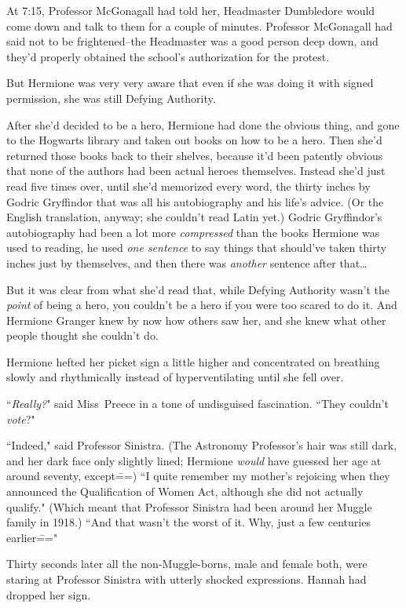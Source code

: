 At 7:15\pm, Professor McGonagall had told her, Headmaster Dumbledore would come down and talk to them for a couple of minutes. Professor McGonagall had said not to be frightened\---the Headmaster was a good person deep down, and they'd properly obtained the school's authorization for the protest.

But Hermione was very very aware that even if she was doing it with signed permission, she was still Defying Authority.

After she'd decided to be a hero, Hermione had done the obvious thing, and gone to the Hogwarts library and taken out books on how to be a hero. Then she'd returned those books back to their shelves, because it'd been patently obvious that none of the authors had been actual heroes themselves. Instead she'd just read five times over, until she'd memorized every word, the thirty inches by Godric Gryffindor that was all his autobiography and his life's advice. (Or the English translation, anyway; she couldn't read Latin yet.) Godric Gryffindor's autobiography had been a lot more \emph{compressed} than the books Hermione was used to reading, he used \emph{one sentence} to say things that should've taken thirty inches just by themselves, and then there was \emph{another} sentence after that{\ldots}

But it was clear from what she'd read that, while Defying Authority wasn't the \emph{point} of being a hero, you couldn't be a hero if you were too scared to do it. And Hermione Granger knew by now how others saw her, and she knew what other people thought she couldn't do.

Hermione hefted her picket sign a little higher and concentrated on breathing slowly and rhythmically instead of hyperventilating until she fell over.

``\emph{Really?}" said Miss~Preece in a tone of undisguised fascination. ``They couldn't \emph{vote}?"

``Indeed," said Professor Sinistra. (The Astronomy Professor's hair was still dark, and her dark face only slightly lined; Hermione \emph{would} have guessed her age at around seventy, except\===) ``I quite remember my mother's rejoicing when they announced the Qualification of Women Act, although she did not actually qualify." (Which meant that Professor Sinistra had been around her Muggle family in 1918.) ``And that wasn't the worst of it. Why, just a few centuries earlier\==="

Thirty seconds later all the non-Muggle-borns, male and female both, were staring at Professor Sinistra with utterly shocked expressions. Hannah had dropped her sign.

